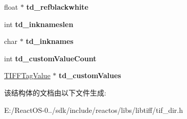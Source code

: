 \begin{DoxyCompactItemize}
\item 
\mbox{\label{struct_t_i_f_f_directory_a28ef3d92c0efbc30979565e3d0295663}} 
float $\ast$ {\bfseries td\+\_\+refblackwhite}
\item 
\mbox{\label{struct_t_i_f_f_directory_a227fb684c1e867ff1dcc9700163bdb9e}} 
int {\bfseries td\+\_\+inknameslen}
\item 
\mbox{\label{struct_t_i_f_f_directory_a7433681cfd69273c8490f44c723cfa1f}} 
char $\ast$ {\bfseries td\+\_\+inknames}
\item 
\mbox{\label{struct_t_i_f_f_directory_a03f3b9a74abd132beb402b1c60d98b93}} 
int {\bfseries td\+\_\+custom\+Value\+Count}
\item 
\mbox{\label{struct_t_i_f_f_directory_aa993e067fa813526e347690bd1da28a2}} 
\hyperlink{struct_t_i_f_f_tag_value}{T\+I\+F\+F\+Tag\+Value} $\ast$ {\bfseries td\+\_\+custom\+Values}
\end{DoxyCompactItemize}


该结构体的文档由以下文件生成\+:\begin{DoxyCompactItemize}
\item 
E\+:/\+React\+O\+S-\/0../sdk/include/reactos/libs/libtiff/tif\+\_\+dir.\+h\end{DoxyCompactItemize}
